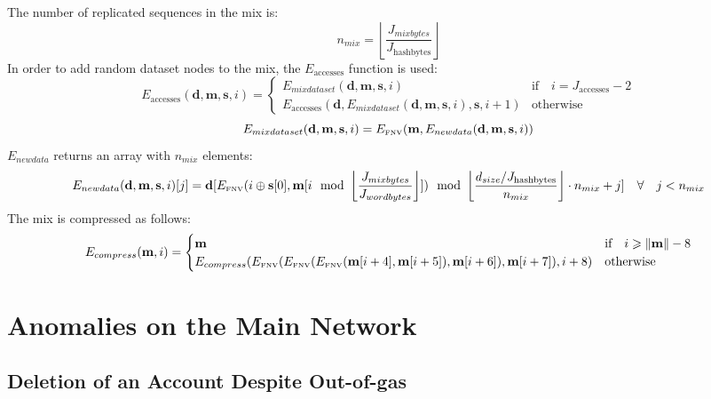 \documentclass[9pt,oneside]{amsart}
\begin{document}
The number of replicated sequences in the mix is:
\begin{equation}
 n_{mix} =  \left\lfloor\frac{J_{mixbytes}}{J_{\mathrm{hashbytes}}}\right\rfloor
\end{equation}
In order to add random dataset nodes to the mix, the $E_{\mathrm{accesses}}$ function is used:
\begin{equation}
 E_{\mathrm{accesses}}(\mathbf{d}, \mathbf{m}, \mathbf{s}, i) = \begin{cases}
E_{mixdataset}(\mathbf{d}, \mathbf{m},  \mathbf{s}, i) & \text{if} \quad i = J_{\mathrm{accesses}} -2 \\
E_{\mathrm{accesses}}(\mathbf{d}, E_{mixdataset}(\mathbf{d}, \mathbf{m}, \mathbf{s}, i), \mathbf{s}, i + 1) & \text{otherwise}
\end{cases}
\end{equation}
\begin{equation}
 E_{mixdataset}(\mathbf{d}, \mathbf{m}, \mathbf{s}, i) = E_\text{\tiny FNV}(\mathbf{m}, E_{newdata}(\mathbf{d}, \mathbf{m}, \mathbf{s}, i))
\end{equation}
$E_{newdata}$ returns an array with $n_{mix}$ elements:
\begin{equation}
 E_{newdata}(\mathbf{d}, \mathbf{m}, \mathbf{s}, i)[j] = \mathbf{d}[E_\text{\tiny FNV}(i \oplus \mathbf{s}[0], \mathbf{m}[i \mod \left\lfloor\frac{J_{mixbytes}}{J_{wordbytes}}\right\rfloor]) \mod \left\lfloor\frac{d_{size} / J_{\mathrm{hashbytes}}}{n_{mix}}\right\rfloor \cdot n_{mix} + j] \quad \forall \quad j < n_{mix}
\end{equation}
The mix is compressed as follows:
\begin{equation}
 E_{compress}(\mathbf{m}, i) = \begin{cases}
\mathbf{m} & \text{if} \quad i \geqslant \lVert \mathbf{m} \rVert - 8 \\
E_{compress}(E_\text{\tiny FNV}(E_\text{\tiny FNV}(E_\text{\tiny FNV}(\mathbf{m}[i + 4], \mathbf{m}[i + 5]), \mathbf{m}[i + 6]), \mathbf{m}[i + 7]), i + 8) & \text{otherwise}
\end{cases}
\end{equation}

\section{Anomalies on the Main Network}

\subsection{Deletion of an Account Despite Out-of-gas}
\end{document}
